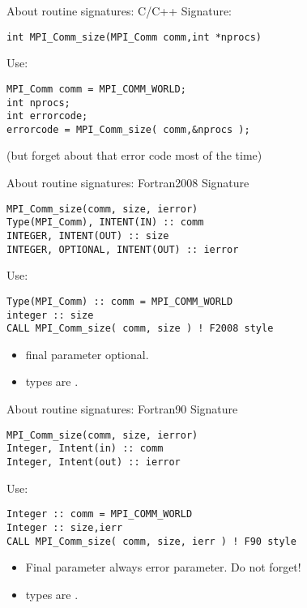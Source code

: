 \begin{mpl}
\end{mpl}

\begin{numberedframe}{About routine signatures: C/C++}
  \label{sec:protos}
Signature:
\lstset{language=C}
\begin{lstlisting}
int MPI_Comm_size(MPI_Comm comm,int *nprocs)
\end{lstlisting}
Use:
\lstset{language=C}
\begin{lstlisting}
MPI_Comm comm = MPI_COMM_WORLD;
int nprocs;
int errorcode;
errorcode = MPI_Comm_size( comm,&nprocs );
\end{lstlisting}
(but forget about that error code most of the time)
\end{numberedframe}

\begin{fortran}
  \addtocounter{slidecount}{-1}

\begin{numberedframe}{About routine signatures: Fortran2008}
Signature
\lstset{language=Fortran}
\begin{lstlisting}
MPI_Comm_size(comm, size, ierror)
Type(MPI_Comm), INTENT(IN) :: comm
INTEGER, INTENT(OUT) :: size
INTEGER, OPTIONAL, INTENT(OUT) :: ierror
\end{lstlisting}
Use:
\begin{lstlisting}
Type(MPI_Comm) :: comm = MPI_COMM_WORLD
integer :: size
CALL MPI_Comm_size( comm, size ) ! F2008 style
\end{lstlisting}
\begin{itemize}
\item final parameter optional.
\item {} types are .
\end{itemize}
\end{numberedframe}

\begin{numberedframe}[b]{About routine signatures: Fortran90}
Signature
\lstset{language=Fortran}
\begin{lstlisting}
MPI_Comm_size(comm, size, ierror)
Integer, Intent(in) :: comm
Integer, Intent(out) :: ierror
\end{lstlisting}
Use:
\begin{lstlisting}
Integer :: comm = MPI_COMM_WORLD
Integer :: size,ierr
CALL MPI_Comm_size( comm, size, ierr ) ! F90 style
\end{lstlisting}
\begin{itemize}
\item Final parameter always error parameter. Do not forget!
\item {} types are .
\end{itemize}
\end{numberedframe}
\end{fortran}


